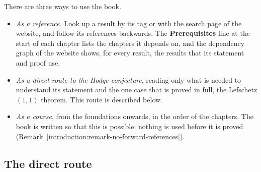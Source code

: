 There are three ways to use the book.
\begin{itemize}
\item \emph{As a reference.} Look up a result by its tag or with the search page of the website, and follow its references backwards. The \textbf{Prerequisites} line at the start of
each chapter lists the chapters it depends on, and the dependency graph of the website shows, for every result, the results that its statement and proof use.
\item \emph{As a direct route to the Hodge conjecture}, reading only what is needed to understand its statement and the one case that is proved in full, the Lefschetz $(1,1)$ theorem. This
route is described below.
\item \emph{As a course}, from the foundations onwards, in the order of the chapters. The book is written so that this is possible: nothing is used before it is proved
(Remark~\ref{introduction:remark-no-forward-references}).
\end{itemize}

\subsection{The direct route}\label{introduction:subsection-direct-route}


